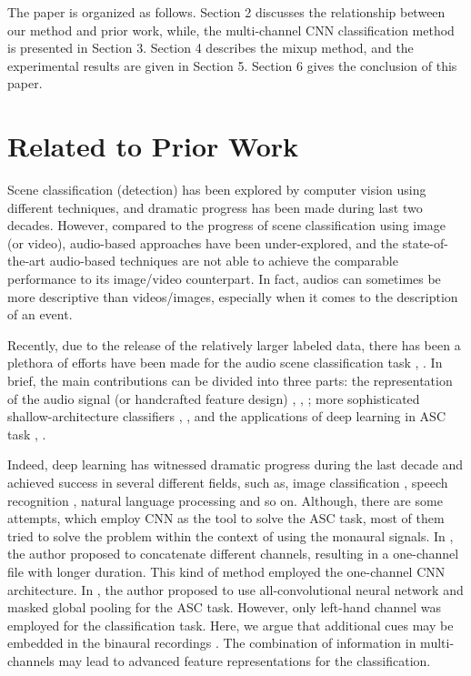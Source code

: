 \documentclass[conference]{IEEEtran}
\begin{document}
The paper is organized as follows. Section 2 discusses the relationship between our method and prior work, while, the multi-channel CNN classification method is presented in Section 3. Section 4 describes the mixup method, and the experimental results are given in Section 5. Section 6 gives the conclusion of this paper.

\section{Related to Prior Work}

Scene classification (detection) has been explored by computer vision using different techniques, and dramatic progress has been made during last two decades. However, compared to the progress of scene classification using image (or video), audio-based approaches have been under-explored, and the state-of-the-art audio-based techniques are not able to achieve the comparable performance to its image/video counterpart. In fact, audios can sometimes be more descriptive than videos/images, especially when it comes to the description of an event.

Recently, due to the release of the relatively larger labeled data, there has been a plethora of efforts have been made for the audio scene classification task \cite{b7}, \cite{b8}. In brief, the main contributions can be divided into three parts: the representation of the audio signal (or handcrafted feature design) \cite{b9},  \cite{b10}, \cite{b11}; more sophisticated shallow-architecture classifiers \cite{b12}, \cite{b13}, \cite{b14} and the applications of deep learning in ASC task \cite{b15}, \cite{b16}. 

Indeed, deep learning has witnessed dramatic progress during the last decade and achieved success in several different fields, such as, image classification \cite{b16}, speech recognition \cite{b17}, natural language processing \cite{b18} and so on. Although, there are some attempts, which employ CNN as the tool to solve the ASC task, most of them tried to solve the problem within the context of using the monaural signals. In \cite{b11}, the author proposed to concatenate different channels, resulting in a one-channel file with longer duration. This kind of method employed the one-channel CNN architecture. In \cite{b20}, the author proposed to use all-convolutional neural network and masked global pooling for the ASC task. However, only left-hand channel was employed for the classification task. Here, we argue that additional cues may be embedded in the binaural recordings \cite{b11}. The combination of information in multi-channels may lead to advanced feature representations for the classification.
\end{document}
